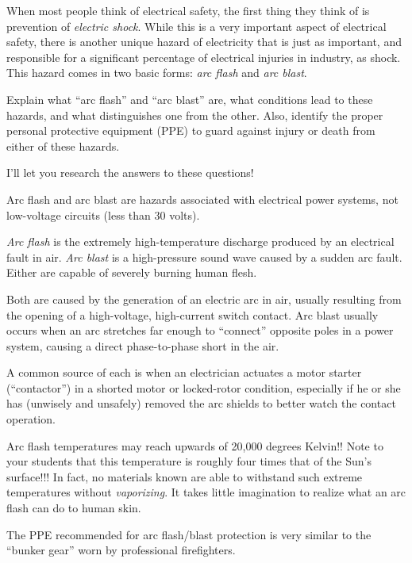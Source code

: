 

When most people think of electrical safety, the first thing they think of is prevention of {\it electric shock}.  While this is a very important aspect of electrical safety, there is another unique hazard of electricity that is just as important, and responsible for a significant percentage of electrical injuries in industry, as shock.  This hazard comes in two basic forms: {\it arc flash} and {\it arc blast}.

Explain what ``arc flash'' and ``arc blast'' are, what conditions lead to these hazards, and what distinguishes one from the other.  Also, identify the proper personal protective equipment (PPE) to guard against injury or death from either of these hazards.







I'll let you research the answers to these questions!







Arc flash and arc blast are hazards associated with electrical power systems, not low-voltage circuits (less than 30 volts).

{\it Arc flash} is the extremely high-temperature discharge produced by an electrical fault in air.  {\it Arc blast} is a high-pressure sound wave caused by a sudden arc fault.  Either are capable of severely burning human flesh.

Both are caused by the generation of an electric arc in air, usually resulting from the opening of a high-voltage, high-current switch contact.  Arc blast usually occurs when an arc stretches far enough to ``connect'' opposite poles in a power system, causing a direct phase-to-phase short in the air.

A common source of each is when an electrician actuates a motor starter (``contactor'') in a shorted motor or locked-rotor condition, especially if he or she has (unwisely and unsafely) removed the arc shields to better watch the contact operation.

\vskip 10pt

Arc flash temperatures may reach upwards of 20,000 degrees Kelvin!!  Note to your students that this temperature is roughly four times that of the Sun's surface!!!  In fact, no materials known are able to withstand such extreme temperatures without {\it vaporizing}.  It takes little imagination to realize what an arc flash can do to human skin.

The PPE recommended for arc flash/blast protection is very similar to the ``bunker gear'' worn by professional firefighters.  




